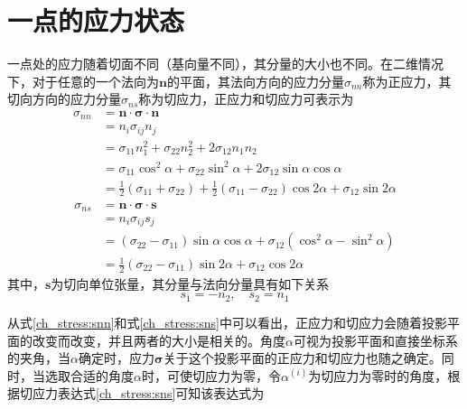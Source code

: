 \section{一点的应力状态}
一点处的应力随着切面不同（基向量不同），其分量的大小也不同。在二维情况下，对于任意的一个法向为$\boldsymbol n$的平面，其法向方向的应力分量$\sigma_{nn}$称为正应力，其切向方向的应力分量$\sigma_{ns}$称为切应力，正应力和切应力可表示为
\begin{equation}\label{ch_stress:snn}
    \begin{split}
        \sigma_{nn} &= \boldsymbol n \cdot \boldsymbol \sigma \cdot \boldsymbol n \\
                    &= n_i \sigma_{ij} n_j \\
                    &= \sigma_{11} n_1^2 + \sigma_{22} n_2^2 + 2\sigma_{12} n_1 n_2 \\
                    &= \sigma_{11} \cos^2 \alpha + \sigma_{22} \sin^2 \alpha + 2\sigma_{12} \sin \alpha \cos \alpha \\
                    &= \frac{1}{2} (\sigma_{11} + \sigma_{22}) + \frac{1}{2}(\sigma_{11} - \sigma_{22}) \cos 2\alpha + \sigma_{12} \sin 2\alpha
    \end{split}
\end{equation}
\begin{equation}\label{ch_stress:sns}
    \begin{split}
        \sigma_{ns} &= \boldsymbol n \cdot \boldsymbol \sigma \cdot \boldsymbol s \\
                    &= n_i \sigma_{ij} s_j \\
                    &= (\sigma_{22} - \sigma_{11})\sin \alpha \cos \alpha + \sigma_{12} (\cos^2 \alpha - \sin^2 \alpha) \\
                    &= \frac{1}{2}(\sigma_{22} - \sigma_{11})\sin 2\alpha + \sigma_{12} \cos 2\alpha
    \end{split}
\end{equation}
其中，$\boldsymbol s$为切向单位张量，其分量与法向分量具有如下关系
\begin{equation}
    s_1 = -n_2, \quad s_2 = n_1
\end{equation} \par
从式\eqref{ch_stress:snn}和式\eqref{ch_stress:sns}中可以看出，正应力和切应力会随着投影平面的改变而改变，并且两者的大小是相关的。角度$\alpha$可视为投影平面和直接坐标系的夹角，当$\alpha$确定时，应力$\boldsymbol \sigma$关于这个投影平面的正应力和切应力也随之确定。同时，当选取合适的角度$\alpha$时，可使切应力为零，令$\alpha^{(i)}$为切应力为零时的角度，根据切应力表达式\eqref{ch_stress:sns}可知该表达式为
